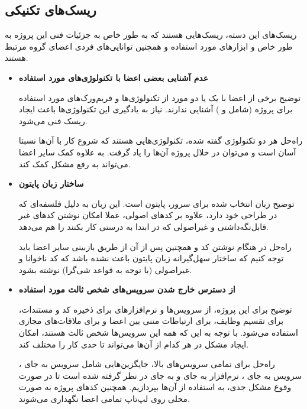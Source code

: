 \subsection{ریسک‌های تکنیکی}

ریسک‌های این دسته، ریسک‌هایی هستند که به طور خاص به جزئیات فنی این پروژه به طور خاص و ابزارهای مورد استفاده و همچنین توانایی‌های فردی اعضای گروه مرتبط هستند.



\begin{itemize}
	\item 
		\textbf{عدم آشنایی بعضی اعضا با تکنولوژی‌های مورد استفاده}
	
	توضیح \hspace*{1cm} 
برخی از اعضا با یک یا دو مورد از تکنولوژی‌ها و فریم‌ورک‌های مورد استفاده برای پروژه (شامل  و ) آشنایی ندارند. نیاز به یادگیری این تکنولوژی‌ها باعث ایجاد ریسک فنی می‌شود.
	
	راه‌حل \hspace*{1cm} 
هر دو تکنولوژی گفته شده، تکنولوژی‌هایی هستند که شروع کار با آن‌ها نسبتا آسان است و می‌توان در خلال پروژه آن‌ها را یاد گرفت. به علاوه کمک سایر اعضا می‌تواند به رفع مشکل کمک کند.

\item 
\textbf{ساختار زبان پایتون}

	توضیح \hspace*{1cm} 
زبان انتخاب شده برای سرور، پایتون است. این زبان به دلیل فلسفه‌ای که در طراحی خود دارد، علاوه بر کدهای اصولی، عملا امکان نوشتن کدهای غیر قابل‌نگه‌داشتی و غیراصولی که در ابتدا به درستی کار بکنند را هم می‌دهد.

راه‌حل \hspace*{1cm} 
در هنگام نوشتن کد و همچنین پس از آن از طریق بازبینی سایر اعضا باید توجه کنیم که ساختار سهل‌گیرانه زبان پایتون باعث نشده باشد که کد ناخوانا و غیراصولی (با توجه به قواعد شی‌گرا) نوشته بشود.



\item
\textbf{از دسترس خارج شدن سرویس‌های شخص ثالث مورد استفاده}

	توضیح \hspace*{1cm} 
برای این پروژه، از سرویس‌ها و نرم‌افزارهای  برای ذخیره کد و مستندات،  برای تقسیم وظایف،  برای ارتباطات متنی بین اعضا و  برای ملاقات‌های مجازی استفاده می‌شود. با توجه به این که همه این سرویس‌ها شخص ثالث هستند،‌ امکان ایجاد مشکل در هر کدام از آن‌ها می‌تواند تا حدی کار را مختلف کند.

راه‌حل \hspace*{1cm} 
برای تمامی سرویس‌های بالا، جایگزین‌هایی شامل سرویس  به جای ، سرویس  به جای ، نرم‌افزار  به جای  و  به جای  در نظر گرفته شده است تا در صورت وقوع مشکل جدی، به استفاده از آن‌ها بپردازیم. همچنین کدهای پروژه به صورت محلی روی لپ‌تاپ تمامی اعضا نگهداری می‌شوند. 



\end{itemize}
